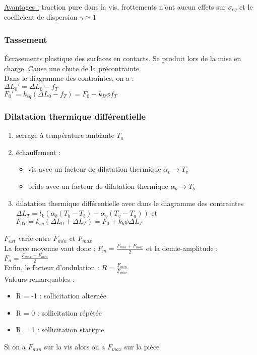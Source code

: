 \documentclass[../main.tex]{subfiles}
\begin{document}
\quad \underline{Avantages :} traction pure dans la vis, frottements n'ont aucun effets sur $\sigma_{eq}$ et le coefficient de dispersion $\gamma \simeq 1$\\

\subsubsection{Tassement}
Écrasements plastique des surfaces en contacts. Se produit lors de la mise en charge. Cause une chute de la précontrainte. \\
Dans le diagramme des contraintes, on a :\\
$\Delta L_0' = \Delta L_0 -f_T$\\
$F_0' = k_{eq} (\Delta L_0 -f_T) = F_0 - k_B\phi f_T$\\

\subsubsection{Dilatation thermique différentielle}
\begin{enumerate}
    \item serrage à température ambiante $T_a$\\
    \item échauffement : \begin{itemize}
        \item vis avec un facteur de dilatation thermique $\alpha_v \rightarrow T_v$\\
        \item bride avec un facteur de dilatation thermique $\alpha_b \rightarrow T_b$\\
    \end{itemize}
    \item dilatation thermique différentielle avec dans le diagramme des contraintes $\Delta L_T = l_k(\alpha_b(T_b-T_b) - \alpha_v(T_v-T_a))$ et $F_{0T} = k_{eq} (\Delta L_0 + \Delta L_T) = F_0 + k_b \phi \Delta L_T$\\
\end{enumerate}

$F_{ext}$ varie entre $F_{min}$ et $F_{max}$\\
La force moyenne vaut donc : $F_m = \frac{F_{min} + F_{max}}{2}$ et la demie-amplitude : $F_a = \frac{F_{max} - F_{min}}{2}$\\
Enfin, le facteur d'ondulation : $R = \frac{F_{min}}{F_{max}}$\\
Valeurs remarquables : \begin{itemize}
    \item R = -1 : sollicitation alternée \\
    \item R = 0 : sollicitation répétée\\
    \item R = 1 : sollicitation statique\\
\end{itemize}
\color{gray}Si on a $F_{min}$ sur la vis alors on a $F_{max}$ sur la pièce\color{black}\\
\end{document}
